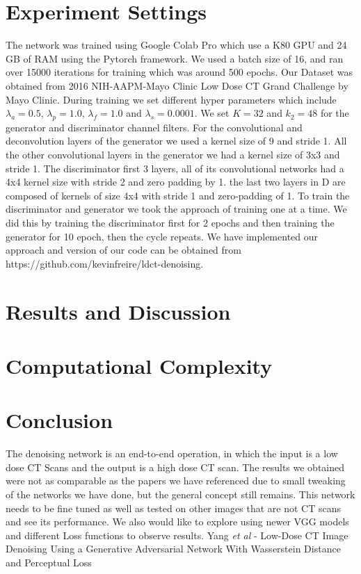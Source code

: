 \documentclass[journal]{IEEEtran}
\begin{document}
\section{Experiment Settings}
\label{experiment settings}
The network was trained using Google Colab Pro which use a K80 GPU and 24 GB of RAM using the Pytorch framework. We used a batch size of 16,  and ran over 15000 iterations for training which was around 500 epochs.  Our Dataset was obtained from 2016 NIH-AAPM-Mayo Clinic Low Dose CT Grand Challenge by Mayo Clinic.  During training we set different hyper parameters which include $\lambda_a=0.5$, $\lambda_p=1.0$, $\lambda_f=1.0$ and $\lambda_s=0.0001$. We set $K=32$ and $k_2=48$ for the generator and discriminator channel filters.  For the convolutional and deconvolution layers of the generator we used a kernel size of 9 and stride 1.  All the other convolutional layers in the generator we had a kernel size of 3x3 and stride 1.   The discriminator first 3 layers, all of its convolutional networks had a 4x4 kernel size with stride 2 and zero padding by 1.  the last two layers in D are composed of kernels of size 4x4 with stride 1 and zero-padding of 1. To train the discriminator and generator we took the approach of training one at a time.  We did this by training the discriminator first for 2 epochs and then training the generator for 10 epoch, then the cycle repeats.  We have implemented our approach and version of our code can be obtained from https://github.com/kevinfreire/ldct-denoising.
\section{Results and Discussion}
\label{results and discussion}

\section{Computational Complexity}
\label{complexity}

\section{Conclusion}
\label{conclusion}
The denoising network is an end-to-end operation, in which the input is a low dose CT Scans and the output is a high dose CT scan.  The results we obtained were not as comparable as the papers we have referenced due to small tweaking of the networks we have done, but the general concept still remains.  This network needs to be fine tuned as well as tested on other images that are not CT scans and see its performance.  We also would like to explore using newer VGG models and different Loss functions to observe results.  
\cleardoublepage
\cite{8340157} Yang \emph{et al} - Low-Dose CT Image Denoising Using a Generative Adversarial Network With Wasserstein Distance and Perceptual Loss
\end{document}
